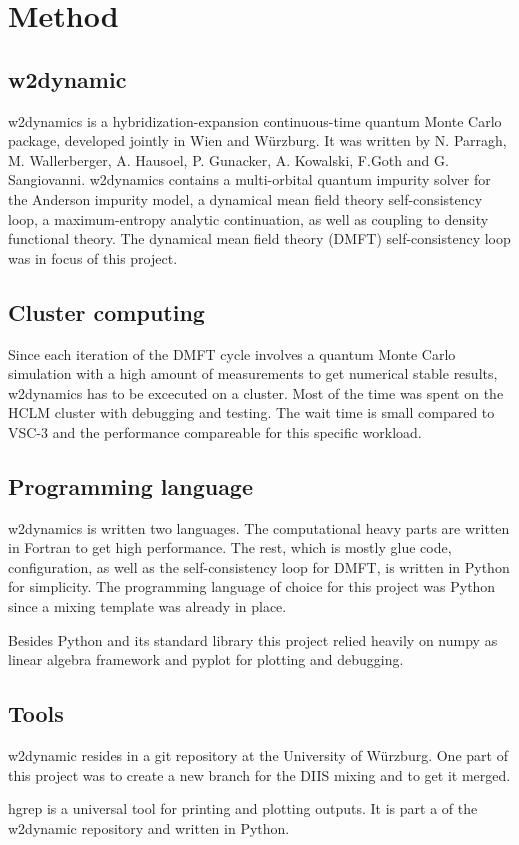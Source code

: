 \chapter{Method}
\label{ch:method}

\section{w2dynamic}

w2dynamics\cite{w2dyn} is a hybridization-expansion continuous-time quantum Monte Carlo package, developed jointly in Wien and Würzburg. It was written by N. Parragh, M. Wallerberger, A. Hausoel, P. Gunacker, A. Kowalski, F.Goth and G. Sangiovanni. w2dynamics contains a multi-orbital quantum impurity solver for the Anderson impurity model, a dynamical mean field theory self-consistency loop, a maximum-entropy analytic continuation, as well as coupling to density functional theory. The dynamical mean field theory (DMFT) self-consistency loop was in focus of this project.

\section{Cluster computing}

Since each iteration of the DMFT cycle involves a quantum Monte Carlo simulation with a high amount of measurements to get numerical stable results, w2dynamics has to be excecuted on a cluster. Most of the time was spent on the HCLM cluster with debugging and testing. The wait time is small compared to VSC-3 and the performance compareable for this specific workload.

\section{Programming language}

w2dynamics is written two languages. The computational heavy parts are written in Fortran to get high performance. The rest, which is mostly glue code, configuration, as well as the self-consistency loop for DMFT, is written in Python for simplicity. The programming language of choice for this project was Python since a mixing template was already in place.

Besides Python and its standard library this project relied heavily on numpy as linear algebra framework and pyplot for plotting and debugging.

\section{Tools}

w2dynamic resides in a git repository at the University of Würzburg. One part of this project was to create a new branch for the DIIS mixing and to get it merged.

hgrep is a universal tool for printing and plotting outputs. It is part a of the w2dynamic repository and written in Python.

